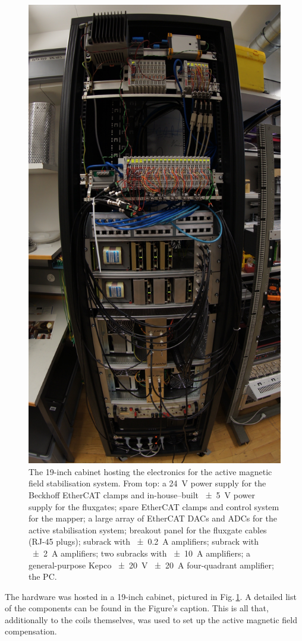 \begin{figure}
  \centering
  \includegraphics[width=0.4\linewidth]{gfx/prototype/DSC03477_cropped.jpeg}
  \caption{The 19-inch cabinet hosting the electronics for the active magnetic field stabilisation system. From top: a \SI{24}{V} power supply for the Beckhoff EtherCAT clamps and in-house--built \SI{\pm 5}{\volt} power supply for the fluxgates; spare EtherCAT clamps and control system for the mapper; a large array of EtherCAT DACs and ADCs for the active stabilisation system; breakout panel for the fluxgate cables (RJ-45 plugs); subrack with \SI{\pm 0.2}{A} amplifiers; subrack with \SI{\pm 2}{A} amplifiers; two subracks with \SI{\pm 10}{A} amplifiers; a general-purpose Kepco \SI{\pm 20}{V} \SI{\pm 20}{A} four-quadrant amplifier; the PC.}
  \label{fig:prototype_photo_daq}
\end{figure}

The hardware was hosted in a 19-inch cabinet, pictured in Fig.\,\ref{fig:prototype_photo_daq}. A detailed list of the components can be found in the Figure's caption. This is all that, additionally to the coils themselves, was used to set up the active magnetic field compensation.


